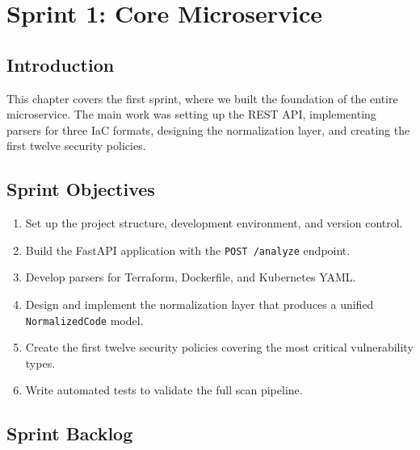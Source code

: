 
\chapter{Sprint 1: Core Microservice}
\label{chap:sprint1}

\section{Introduction}

This chapter covers the first sprint, where we built the foundation of the entire microservice. The main work was setting up the REST API, implementing parsers for three IaC formats, designing the normalization layer, and creating the first twelve security policies.


\section{Sprint Objectives}

\begin{enumerate}[leftmargin=1.5cm]
  \item Set up the project structure, development environment, and version control.
  \item Build the FastAPI application with the \texttt{POST /analyze} endpoint.
  \item Develop parsers for Terraform, Dockerfile, and Kubernetes YAML.
  \item Design and implement the normalization layer that produces a unified \texttt{NormalizedCode} model.
  \item Create the first twelve security policies covering the most critical vulnerability types.
  \item Write automated tests to validate the full scan pipeline.
\end{enumerate}


\section{Sprint Backlog}

